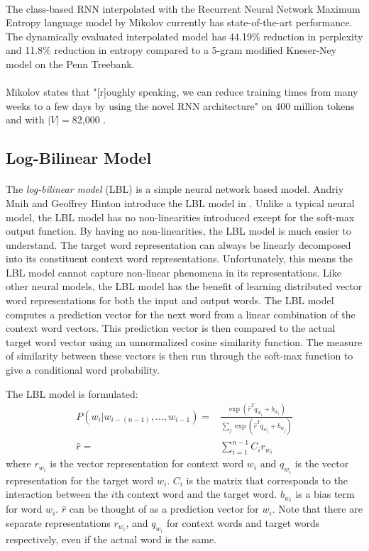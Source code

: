 \paragraph{}
The class-based RNN interpolated with the Recurrent Neural Network Maximum Entropy language model by Mikolov \cite{Mikolov2012} currently has state-of-the-art performance. The dynamically evaluated interpolated model has 44.19\% reduction in perplexity and 11.8\% reduction in entropy compared to a 5-gram modified Kneser-Ney model on the Penn Treebank.
\paragraph{}
Mikolov states that "[r]oughly speaking, we can reduce training times from many weeks to a few days by using the novel RNN architecture" on $400$ million tokens and with $|V|=$82,000 \cite[pg. 93]{Mikolov2012}. 

\subsection{Log-Bilinear Model} \label{sec:lbl}
\paragraph{}
The \emph{log-bilinear model} (LBL) is a simple neural network based model. Andriy Mnih and Geoffrey Hinton introduce the LBL model in \cite{MnihHinton2007}. Unlike a typical neural model, the LBL model has no non-linearities introduced except for the soft-max output function. By having no non-linearities, the LBL model is much easier to understand. The target word representation can always be linearly decomposed into its constituent context word representations. Unfortunately, this means the LBL model cannot capture non-linear phenomena in its representations. Like other neural models, the LBL model has the benefit of learning distributed vector word representations for both the input and output words.  The LBL model computes a prediction vector for the next word from a linear combination of the context word vectors. This prediction vector is then compared to the actual target word vector using an unnormalized cosine similarity function. The measure of similarity between these vectors is then run through the soft-max function to give a conditional word probability.

The LBL model is formulated:
\begin{align}
P(w_i | w_{i-(n-1)},\dots, w_{i-1})  =& \frac{ \exp( \hat{r}^T q_{w_i} +b_{w_i}) } { \sum_j \exp( \hat{r}^T q_{w_j} +b_{w_j})} \label{eq:LBL}
\\ 
\hat{r} =& \sum_{i=1}^{n-1} C_i r_{w_i} \nonumber
\end{align} 
where $r_{w_i}$ is the vector representation for context word $w_i$ and $q_{w_i}$ is the vector representation for the target word $w_i$. $C_i$ is the matrix that corresponds to the interaction between the $i$th context word and the target word. $b_{w_i}$ is a bias term for word $w_i$. $\hat{r}$ can be thought of as a prediction vector for $w_i$. Note that there are separate representations $r_{w_i}$, and $q_{w_i}$ for context words and target words respectively, even if the actual word is the same.

